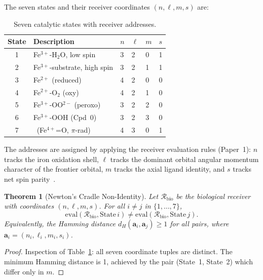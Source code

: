 \documentclass[11pt,twocolumn,a4paper]{article}
\newtheorem{theorem}{Theorem}[section]
\theoremstyle{definition}
\theoremstyle{remark}
\newcommand{\Recv}{\mathcal{R}}
\newcommand{\eval}{\mathrm{eval}}
\newcommand{\CmpdI}{\mathrm{Cpd\,I}}
\begin{document}
The seven states and their receiver coordinates $(n, \ell, m, s)$ are:

\begin{table}[H]
\centering
\caption{Seven catalytic states with receiver addresses.}
\label{tab:states}
\begin{tabular}{clllll}
\toprule
State & Description & $n$ & $\ell$ & $m$ & $s$ \\
\midrule
1 & Fe$^{3+}$-H$_2$O, low spin  & 3 & 2 & 0 & 1 \\
2 & Fe$^{3+}$-substrate, high spin & 3 & 2 & 1 & 1 \\
3 & Fe$^{2+}$ (reduced) & 4 & 2 & 0 & 0 \\
4 & Fe$^{2+}$-O$_2$ (oxy) & 4 & 2 & 1 & 0 \\
5 & Fe$^{3+}$-OO$^{2-}$ (peroxo) & 3 & 2 & 2 & 0 \\
6 & Fe$^{3+}$-OOH (Cpd~0) & 3 & 2 & 3 & 0 \\
7 & \CmpdI~(Fe$^{4+}$=O, $\pi$-rad) & 4 & 3 & 0 & 1 \\
\bottomrule
\end{tabular}
\end{table}

The addresses are assigned by applying the receiver evaluation rules
(Paper~1): $n$ tracks the iron oxidation shell, $\ell$ tracks the dominant
orbital angular momentum character of the frontier orbital, $m$ tracks the
axial ligand identity, and $s$ tracks net spin parity~\citep{bren2015}.

\begin{theorem}[Newton's Cradle Non-Identity]
\label{thm:nonidentity}
Let $\Recv_\mathrm{bio}$ be the biological receiver with coordinates
$(n, \ell, m, s)$.  For all $i \neq j$ in $\{1,\ldots,7\}$,
\begin{equation}
  \eval(\Recv_\mathrm{bio}, \mathrm{State}\,i)
  \neq \eval(\Recv_\mathrm{bio}, \mathrm{State}\,j).
\end{equation}
Equivalently, the Hamming distance $d_H(\mathbf{a}_i, \mathbf{a}_j) \geq 1$
for all pairs, where $\mathbf{a}_i = (n_i, \ell_i, m_i, s_i)$.
\end{theorem}

\begin{proof}
Inspection of Table~\ref{tab:states}: all seven coordinate tuples are distinct.
The minimum Hamming distance is 1, achieved by the pair (State~1, State~2)
which differ only in $m$.
\end{proof}
\end{document}
